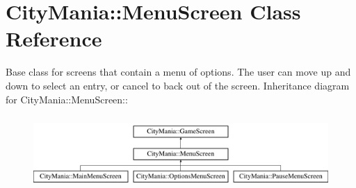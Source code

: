 \hypertarget{classCityMania_1_1MenuScreen}{
\section{CityMania::MenuScreen Class Reference}
\label{classCityMania_1_1MenuScreen}
}


Base class for screens that contain a menu of options. The user can move up and down to select an entry, or cancel to back out of the screen.  
Inheritance diagram for CityMania::MenuScreen::\begin{figure}[H]
\begin{center}
\leavevmode
\includegraphics[height=2.81407cm]{classCityMania_1_1MenuScreen}
\end{center}
\end{figure}
